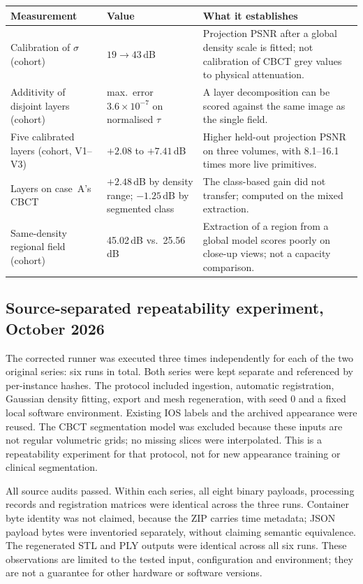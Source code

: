 \documentclass[11pt,a4paper]{article}
\begin{document}
\begin{longtable}{L{5.6cm} L{4.0cm} L{5.6cm}}
\toprule
\textbf{Measurement} & \textbf{Value} & \textbf{What it establishes}\\
\midrule
\endhead
Calibration of $\sigma$ (cohort) & $19 \to 43$\,dB & Projection PSNR after a global
density scale is fitted; not calibration of CBCT grey values to physical attenuation.\\

Additivity of disjoint layers (cohort) & max.\ error $3.6\times10^{-7}$ on normalised $\tau$
& A layer decomposition can be scored against the same image as the single field.\\

Five calibrated layers (cohort, V1--V3) & $+2.08$ to $+7.41$\,dB & Higher held-out
projection PSNR on three volumes, with 8.1--16.1 times more live primitives.\\

Layers on case~A's CBCT & $+2.48$\,dB by density range; $-1.25$\,dB by segmented class &
The class-based gain did not transfer; computed on the mixed extraction.\\

Same-density regional field (cohort) & 45.02\,dB vs.\ 25.56\,dB & Extraction of a region
from a global model scores poorly on close-up views; not a capacity comparison.\\
\bottomrule
\end{longtable}


\subsection{Source-separated repeatability experiment, October 2026}

The corrected runner was executed three times independently for each of the two original
series: six runs in total. Both series were kept separate and referenced by per-instance
hashes. The protocol included ingestion, automatic registration, Gaussian density fitting,
export and mesh regeneration, with seed 0 and a fixed local software environment.
Existing IOS labels and the archived appearance were reused. The CBCT segmentation model
was excluded because these inputs are not regular volumetric grids; no missing slices were
interpolated. This is a repeatability experiment for that protocol, not for new appearance
training or clinical segmentation.

All source audits passed. Within each series, all eight binary payloads, processing records
and registration matrices were identical across the three runs. Container byte identity was
not claimed, because the ZIP carries time metadata; JSON payload bytes were inventoried separately, without claiming semantic equivalence.
The regenerated STL and PLY outputs were identical across all six runs. These observations
are limited to the tested input, configuration and environment; they are not a guarantee
for other hardware or software versions.
\end{document}
